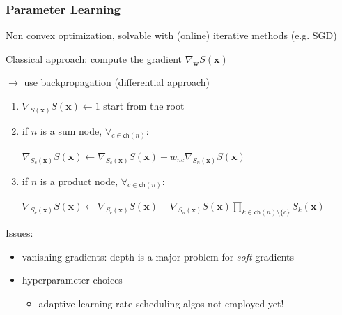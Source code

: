 \documentclass[10pt, t, xcolor={usenames,dvipsnames,svgnames}, compress]{beamer}
\begin{document}
\begin{frame}
  \frametitle{Parameter Learning}
  Non convex optimization, solvable with (online) iterative methods
  (e.g. SGD)\par\bigskip

  Classical approach: compute the gradient $\nabla_{\mathbf{w}}
  S(\mathbf{x})$\par
  $\rightarrow$ use backpropagation (differential
  approach)\par
  \begin{enumerate}
  \item $\nabla_{S(\mathbf{x})} S(\mathbf{x})\leftarrow 1$ start from
    the root
  \item if $n$ is a sum node, $\forall_{c\in\mathsf{ch}(n)}$:\par
    $\nabla_{S_{c}(\mathbf{x})}S(\mathbf{x})\leftarrow
    \nabla_{S_{c}(\mathbf{x})}S(\mathbf{x}) + w_{nc}\nabla_{S_{n}(\mathbf{x})}S(\mathbf{x})$ 
  \item if $n$ is a product node, $\forall_{c\in\mathsf{ch}(n)}$:\par
    $\nabla_{S_{c}(\mathbf{x})}S(\mathbf{x})\leftarrow
    \nabla_{S_{c}(\mathbf{x})}S(\mathbf{x}) + \nabla_{S_{n}(\mathbf{x})}S(\mathbf{x})\prod_{k\in\mathsf{ch}(n)\setminus\{c\}}S_{k}(\mathbf{x})$
  \end{enumerate}
  \par%


  Issues:
  \begin{itemize}
  \item vanishing gradients: depth is a major problem for \emph{soft} gradients
  \item hyperparameter choices
    \begin{itemize}
    \item adaptive learning rate scheduling algos not employed yet!
    \end{itemize}
  \end{itemize}
\end{frame}
\end{document}
